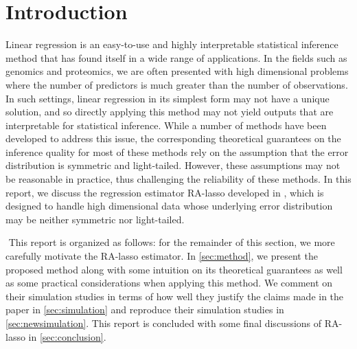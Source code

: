 

\section{Introduction}
Linear regression is an easy-to-use and highly interpretable statistical inference method that has found itself in a wide range of applications. In the fields such as genomics and proteomics, we are often presented with high dimensional problems where the number of predictors is much greater than the number of observations. In such settings, linear regression in its simplest form may not have a unique solution, and so directly applying this method may not yield outputs that are interpretable for statistical inference. While a number of methods have been developed to address this issue, the corresponding theoretical guarantees on the inference quality for most of these methods rely on the assumption that the error distribution is symmetric and light-tailed. However, these assumptions may not be reasonable in practice, thus challenging the reliability of these methods. In this report, we discuss the regression estimator RA-lasso developed in \citet{fan2017estimation}, which is designed to handle high dimensional data whose underlying error distribution may be neither symmetric nor light-tailed.

$ $\newline
This report is organized as follows: for the remainder of this section, we more carefully motivate the RA-lasso estimator. In \cref{sec:method}, we present the proposed method along with some intuition on its theoretical guarantees as well as some practical considerations when applying this method. We comment on their simulation studies in terms of how well they justify the claims made in the paper in \cref{sec:simulation} and reproduce their simulation studies in \cref{sec:newsimulation}. This report is concluded with some final discussions of RA-lasso in \cref{sec:conclusion}.